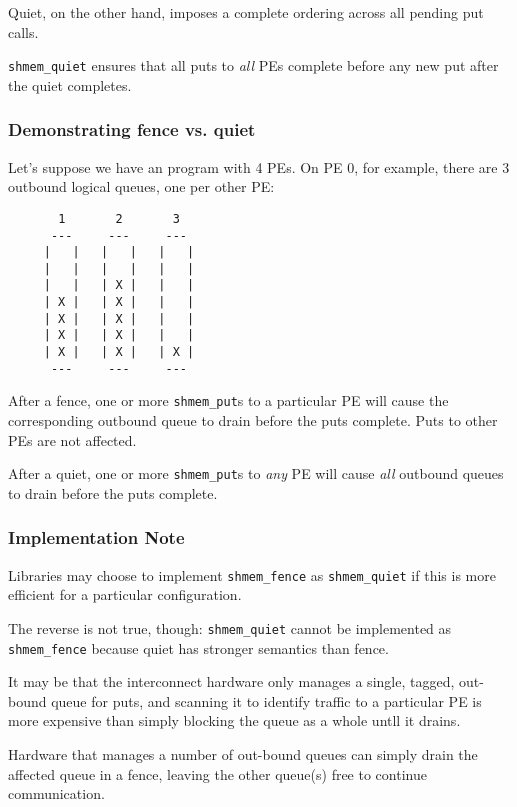 Quiet, on the other hand, imposes a complete ordering across all
pending put calls.

\texttt{shmem\_quiet} ensures that all puts to \emph{all} PEs complete
before any new put after the quiet completes.

\subsubsection{Demonstrating fence vs. quiet}

Let's suppose we have an \openshmem program with 4 PEs.  On PE 0, for
example, there are 3 outbound logical queues, one per other PE:

\vspace{0.2in}
\begin{verbatim}
       1       2       3
      ---     ---     ---
     |   |   |   |   |   |
     |   |   |   |   |   |
     |   |   | X |   |   |
     | X |   | X |   |   |
     | X |   | X |   |   |
     | X |   | X |   |   |
     | X |   | X |   | X |
      ---     ---     ---
\end{verbatim}
\vspace{0.2in}

After a fence, one or more \texttt{shmem\_put}s to a particular PE
will cause the corresponding outbound queue to drain before the puts
complete.  Puts to other PEs are not affected.

After a quiet, one or more \texttt{shmem\_put}s to \emph{any} PE will
cause \emph{all} outbound queues to drain before the puts complete.

\subsubsection*{Implementation Note}

Libraries may choose to implement \texttt{shmem\_fence} as
\texttt{shmem\_quiet} if this is more efficient for a particular
configuration.

The reverse is not true, though: \texttt{shmem\_quiet} cannot be
implemented as \texttt{shmem\_fence} because quiet has stronger
semantics than fence.

It may be that the interconnect hardware only manages a single,
tagged, out-bound queue for puts, and scanning it to identify traffic
to a particular PE is more expensive than simply blocking the queue as
a whole untll it drains.

Hardware that manages a number of out-bound queues can simply drain
the affected queue in a fence, leaving the other queue(s) free to
continue communication.

